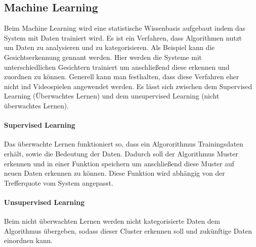 \subsection{Machine Learning}
\label{ch:Grundlagen:sec:Learning}
Beim Machine Learning wird eine statistische Wissenbasis aufgebaut indem das System mit Daten trainiert wird. Es ist ein Verfahren, dass Algorithmen nutzt um Daten zu analysieren und zu kategorisieren. Als Beispiel kann die Gesichtserkennung gennant werden. Hier werden die Systeme mit unterschiedlichen Gesichtern trainiert um anschließend diese erkennen und zuordnen zu können. Generell kann man festhalten, dass diese Verfahren eher nicht ind Videospielen angewendet werden. Es lässt sich zwischen dem Supervised Learning (Überwachtes Lernen) und dem unsupervised Learning (nicht überwachtes Lernen).
\paragraph{Supervised Learning}
Das überwachte Lernen funktioniert so, dass ein Algororithmus Trainingsdaten erhält, sowie die Bedeutung der Daten. Dadurch soll der Algorithmus Muster erkennen und in einer Funktion speichern um anschließend diese Muster auf neuen Daten erkennen zu können. Diese Funktion wird abhängig von der Trefferquote vom System angepasst.
\paragraph{Unsupervised Learning}
Beim nicht überwachten Lernen werden nicht kategorisierte Daten dem Algorithmus übergeben, sodass dieser Cluster erkennen soll und zukünftige Daten einordnen kann.\\





